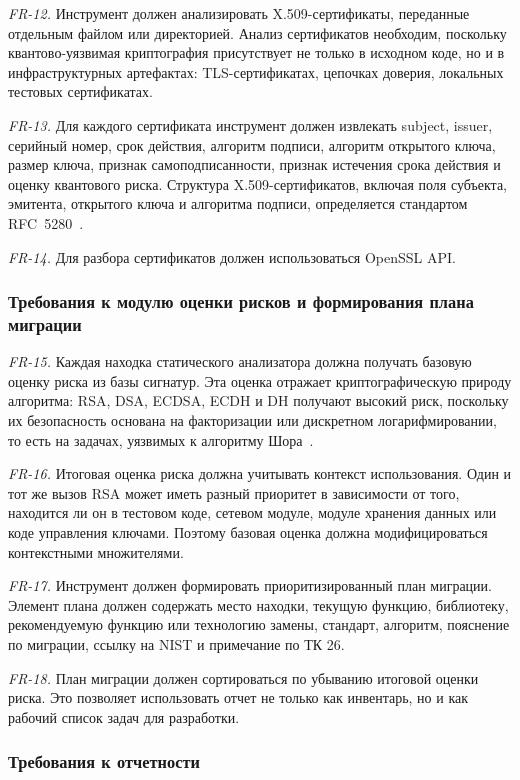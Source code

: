 \documentclass{itmo-vkr}
\begin{document}
	\textit{FR-12.} Инструмент должен анализировать X.509-сертификаты, переданные отдельным файлом или директорией. Анализ сертификатов необходим, поскольку квантово-уязвимая криптография присутствует не только в исходном коде, но и в инфраструктурных артефактах: TLS-сертификатах, цепочках доверия, локальных тестовых сертификатах.
	
	\textit{FR-13.} Для каждого сертификата инструмент должен извлекать subject, issuer, серийный номер, срок действия, алгоритм подписи, алгоритм открытого ключа, размер ключа, признак самоподписанности, признак истечения срока действия и оценку квантового риска. Структура X.509-сертификатов, включая поля субъекта, эмитента, открытого ключа и алгоритма подписи, определяется стандартом RFC~5280~\cite{rfc5280}.
	
	\textit{FR-14.} Для разбора сертификатов должен использоваться OpenSSL API.
	
	
	\subsubsection{Требования к модулю оценки рисков и формирования плана миграции}
	
	\textit{FR-15.} Каждая находка статического анализатора должна получать базовую оценку риска из базы сигнатур. Эта оценка отражает криптографическую природу алгоритма: RSA, DSA, ECDSA, ECDH и DH получают высокий риск, поскольку их безопасность основана на факторизации или дискретном логарифмировании, то есть на задачах, уязвимых к алгоритму Шора~\cite{1994Shor}.
	
	\textit{FR-16.} Итоговая оценка риска должна учитывать контекст использования. Один и тот же вызов RSA может иметь разный приоритет в зависимости от того, находится ли он в тестовом коде, сетевом модуле, модуле хранения данных или коде управления ключами. Поэтому базовая оценка должна модифицироваться контекстными множителями.
	
	\textit{FR-17.} Инструмент должен формировать приоритизированный план миграции. Элемент плана должен содержать место находки, текущую функцию, библиотеку, рекомендуемую функцию или технологию замены, стандарт, алгоритм, пояснение по миграции, ссылку на NIST и примечание по ТК 26.
	
	\textit{FR-18.} План миграции должен сортироваться по убыванию итоговой оценки риска. Это позволяет использовать отчет не только как инвентарь, но и как рабочий список задач для разработки.
	
	
	\subsubsection{Требования к отчетности}
	
\end{document}
